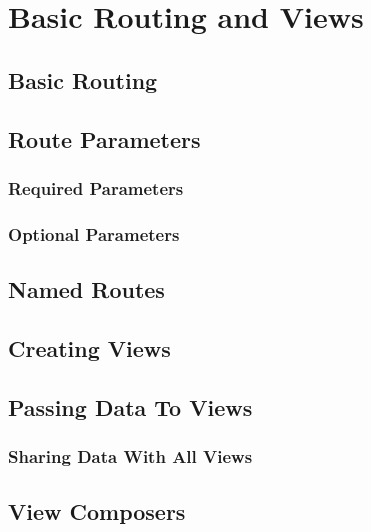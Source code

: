 \chapter{Basic Routing and Views }
\section{Basic Routing}
\section{Route Parameters}
\subsection{Required Parameters}
\subsection{Optional Parameters}
\section{Named Routes}
\section{Creating Views}
\section{Passing Data To Views}
\subsection{Sharing Data With All Views}
\section{View Composers}

